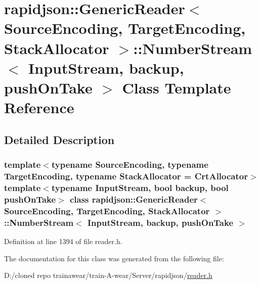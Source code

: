 \hypertarget{classrapidjson_1_1_generic_reader_1_1_number_stream}{}\section{rapidjson\+::Generic\+Reader$<$ Source\+Encoding, Target\+Encoding, Stack\+Allocator $>$\+::Number\+Stream$<$ Input\+Stream, backup, push\+On\+Take $>$ Class Template Reference}
\label{classrapidjson_1_1_generic_reader_1_1_number_stream}


\subsection{Detailed Description}
\subsubsection*{template$<$typename Source\+Encoding, typename Target\+Encoding, typename Stack\+Allocator = Crt\+Allocator$>$\newline
template$<$typename Input\+Stream, bool backup, bool push\+On\+Take$>$\newline
class rapidjson\+::\+Generic\+Reader$<$ Source\+Encoding, Target\+Encoding, Stack\+Allocator $>$\+::\+Number\+Stream$<$ Input\+Stream, backup, push\+On\+Take $>$}



Definition at line 1394 of file reader.\+h.



The documentation for this class was generated from the following file\+:\begin{DoxyCompactItemize}
\item 
D\+:/cloned repo trainawear/train-\/\+A-\/wear/\+Server/rapidjson/\mbox{\hyperlink{reader_8h}{reader.\+h}}\end{DoxyCompactItemize}
